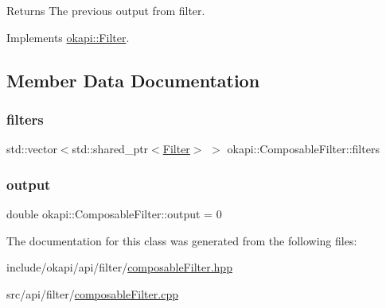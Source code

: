 \begin{DoxyReturn}{Returns}
The previous output from filter. 
\end{DoxyReturn}


Implements \mbox{\hyperlink{classokapi_1_1Filter_a3469cd4bc108f8accf300d9f5cc9f42f}{okapi\+::\+Filter}}.



\subsection{Member Data Documentation}
\mbox{\label{classokapi_1_1ComposableFilter_a83da1d231c702e8db79557a2b458fc90}} 
\subsubsection{\texorpdfstring{filters}{filters}}
{\footnotesize\ttfamily std\+::vector$<$std\+::shared\+\_\+ptr$<$\mbox{\hyperlink{classokapi_1_1Filter}{Filter}}$>$ $>$ okapi\+::\+Composable\+Filter\+::filters\hspace{0.3cm}{\ttfamily [protected]}}

\mbox{\label{classokapi_1_1ComposableFilter_ab956536a303c97c86fd2ec3af3c35eef}} 
\subsubsection{\texorpdfstring{output}{output}}
{\footnotesize\ttfamily double okapi\+::\+Composable\+Filter\+::output = 0\hspace{0.3cm}{\ttfamily [protected]}}



The documentation for this class was generated from the following files\+:\begin{DoxyCompactItemize}
\item 
include/okapi/api/filter/\mbox{\hyperlink{composableFilter_8hpp}{composable\+Filter.\+hpp}}\item 
src/api/filter/\mbox{\hyperlink{composableFilter_8cpp}{composable\+Filter.\+cpp}}\end{DoxyCompactItemize}
